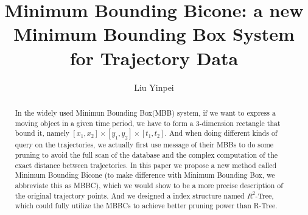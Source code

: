 \documentclass[sigplan]{acmart}
\begin{document}
\title{Minimum Bounding Bicone: a new Minimum Bounding Box System for Trajectory Data}
\author{Liu Yinpei}
\begin{abstract}
In the widely used Minimun Bounding Box(MBB) system, if we want to express a moving object in a given time period, we have to form a 3-dimension rectangle that bound it, namely $[x_1,x_2] \times [y_1,y_2] \times [t_1,t_2]$. And when doing different kinds of query on the trajectories, we actually first use message of their MBBs to do some pruning to avoid the full scan of the database and the complex computation of the exact distance between trajectories. In this paper we propose a new method called Minimum Bounding Bicone (to make difference with Minimum Bounding Box, we abbreviate this as MBBC), which we would show to be a more precise description of the original trajectory points. And we designed a index structure named $R^2$-Tree, which could fully utilize the MBBCs to achieve better pruning power than R-Tree.
\end{abstract}

\maketitle
\end{document}
